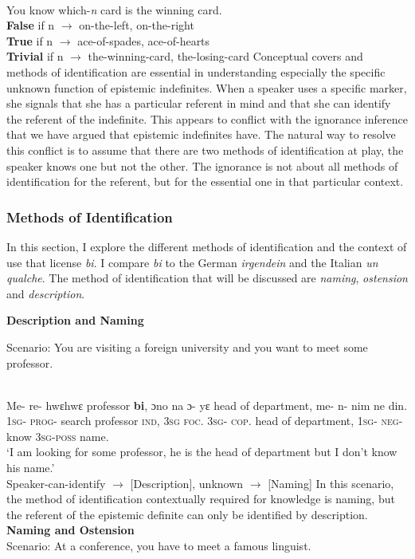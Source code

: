 \documentclass[output=paper,modfonts,nonflat,draftmode]{langsci/langscibook}
\begin{document}
\ea\label{owusu:ex45}\\
 You know which-\emph{n} card is the winning card.\\
 \textbf{False} if n $\longrightarrow$ {on-the-left, on-the-right}\\
 \textbf{True} if n $\longrightarrow$ {ace-of-spades, ace-of-hearts} \\
 \textbf{Trivial} if n $\longrightarrow$ {the-winning-card, the-losing-card}
\z 
Conceptual covers and methods of identification are essential in understanding especially the specific unknown function of epistemic indefinites. When a speaker uses a specific marker, she signals that she has a particular referent in mind and that she can identify the referent of the indefinite. This appears to conflict with the ignorance inference that we have argued that epistemic indefinites have. The natural way to resolve this conflict is to assume that there are two methods of identification at play, the speaker knows one but not the other. The ignorance is not about all methods of identification for the referent, but for the essential one in that particular context.  

\subsubsection{Methods of Identification}
In this section, I explore the different methods of identification and the context of use that license \emph{bi}. I compare \emph{bi} to the German \emph{irgendein} and the Italian \emph{un qualche}. The method of identification that will be discussed are \emph{naming}, \emph{ostension} and \emph{description}.

\textbf{Description and Naming}

Scenario: You are visiting a foreign university and you want to meet some professor.

\ea\label{owusu:ex45a}\\
\gll Me- re- hwεhwε professor \textbf{bi}, ɔno na ɔ- yε head of department, me- n- nim ne din.\\
\textsc{1sg}- \textsc{prog}- search professor \textsc{ind}, \textsc{3sg} \textsc{foc}. \textsc{3sg}- \textsc{cop}. head of department, \textsc{1sg}- \textsc{neg}- know \textsc{3sg}-\textsc{poss} name.\\
\glt `I am looking for some professor, he is the head of department but I don't know his name.'\\
	Speaker-can-identify $\rightarrow$ [Description], unknown $\rightarrow$  [Naming]
 \z  In this scenario, the method of identification contextually required for knowledge is naming, but the referent of the epistemic definite can only be identified by description. \\
\textbf{Naming and Ostension}\\
Scenario: At a conference, you have to meet a famous linguist.
\end{document}
